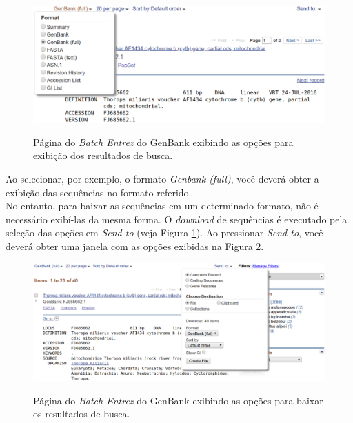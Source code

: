 \begin{refsection}
  \begin{figure}[H]
       \centering
      {\includegraphics[scale=0.5]{figures/tut7/display_settings.eps}}
	{\caption[GenBnank \textit{Batch Entrez}: seleção de formato de exibição]{Página do \textit{Batch Entrez} do GenBank exibindo as opções para exibição dos resultados de busca.}\label{tut7:fig:display_settings}}
  \end{figure}


Ao selecionar, por exemplo, o formato \textit{Genbank (full)}, você deverá obter a exibição das sequências no formato referido.\\
No entanto, para baixar as sequências em um determinado formato, não é necessário exibí-las da mesma forma. O \textit{download} de sequências é executado pela seleção das opções em \textit{Send to} (veja Figura \ref{tut7:fig:display_settings}). Ao pressionar \textit{Send to}, você deverá obter uma janela com as opções exibidas na Figura \ref{tut7:fig:send_to_file}.\\

  \begin{figure}[H]
       \centering
      {\includegraphics[scale=0.3]{figures/tut7/send_to_file.eps}}
	{\caption[GenBnank \textit{Batch Entrez}: seleção de formato para baixar sequências]{Página do \textit{Batch Entrez} do GenBank exibindo as opções para baixar os resultados de busca.}\label{tut7:fig:send_to_file}}
  \end{figure}


\end{refsection}

